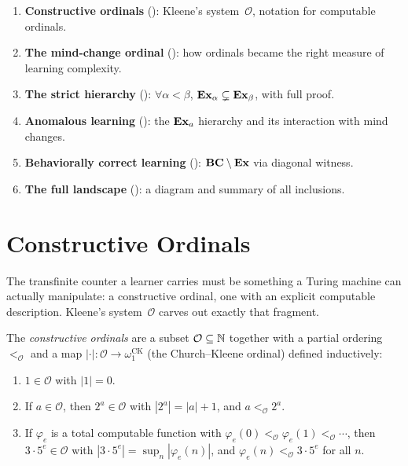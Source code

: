 \begin{enumerate}[leftmargin=*,itemsep=2pt]
\item \textbf{Constructive ordinals} ():
  Kleene's system~$\mathcal{O}$, notation for computable ordinals.
\item \textbf{The mind-change ordinal} ():
  how ordinals became the right measure of learning complexity.
\item \textbf{The strict hierarchy} ():
  $\forall \alpha < \beta$, $\mathbf{Ex}_\alpha \subsetneq \mathbf{Ex}_\beta$, with full proof.
\item \textbf{Anomalous learning} (): the $\mathbf{Ex}_a$
  hierarchy and its interaction with mind changes.
\item \textbf{Behaviorally correct learning} ():
  $\mathbf{BC} \setminus \mathbf{Ex}$ via diagonal witness.
\item \textbf{The full landscape} ():
  a diagram and summary of all inclusions.
\end{enumerate}



\section{Constructive Ordinals}
\label{sec:constructive-ordinals}

The transfinite counter a learner carries must be something a Turing machine
can actually manipulate: a constructive ordinal, one with an explicit
computable description.  Kleene's system~$\mathcal{O}$ carves out
exactly that fragment.

\begin{defn}
\label{def:system-O}
The \emph{constructive ordinals} are a subset $\mathcal{O} \subseteq \mathbb{N}$
together with a partial ordering $<_{\mathcal{O}}$ and a map
$|\cdot| : \mathcal{O} \to \omega_1^{\mathrm{CK}}$ (the Church--Kleene
ordinal) defined inductively:
\begin{enumerate}[leftmargin=*,itemsep=2pt]
\item $1 \in \mathcal{O}$ with $|1| = 0$.
\item If $a \in \mathcal{O}$, then $2^a \in \mathcal{O}$ with
  $|2^a| = |a| + 1$, and $a <_{\mathcal{O}} 2^a$.
\item If $\varphi_e$ is a total computable function with
  $\varphi_e(0) <_{\mathcal{O}} \varphi_e(1) <_{\mathcal{O}} \cdots$,
  then $3 \cdot 5^e \in \mathcal{O}$ with
  $|3 \cdot 5^e| = \sup_n |\varphi_e(n)|$, and
  $\varphi_e(n) <_{\mathcal{O}} 3 \cdot 5^e$ for all $n$.
\end{enumerate}
\end{defn}

